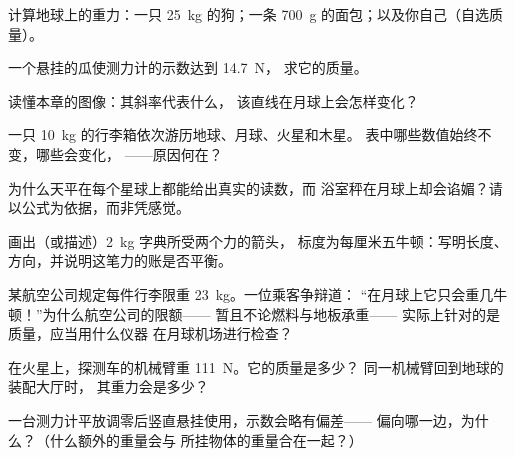 \begin{exercise}[$\star$]\label{exo:g9:weight-vs-mass:3}
计算地球上的重力：一只 \qty{25}{kg} 的狗；一条 \qty{700}{g}
的面包；以及你自己（自选质量）。
\end{exercise}

\begin{exercise}[$\star$]\label{exo:g9:weight-vs-mass:4}
一个悬挂的瓜使测力计的示数达到 \qty{14.7}{N}，
求它的质量。
\end{exercise}

\begin{exercise}[$\star$]\label{exo:g9:weight-vs-mass:5}
读懂本章的图像：其斜率代表什么，
该直线在月球上会怎样变化？
\end{exercise}

\begin{exercise}[$\star$]\label{exo:g9:weight-vs-mass:6}
一只 \qty{10}{kg} 的行李箱依次游历地球、月球、火星和木星。
表中哪些数值始终不变，哪些会变化，
——原因何在？
\end{exercise}

\begin{exercise}[$\star$]\label{exo:g9:weight-vs-mass:7}
为什么天平在每个星球上都能给出真实的读数，而
浴室秤在月球上却会谄媚？请以公式为依据，而非凭感觉。
\end{exercise}

\begin{exercise}[$\star$]\label{exo:g9:weight-vs-mass:8}
画出（或描述）\qty{2}{kg} 字典所受两个力的箭头，
标度为每厘米五牛顿：写明长度、
方向，并说明这笔力的账是否平衡。
\end{exercise}

\begin{exercise}[$\star\star$]\label{exo:g9:weight-vs-mass:9}
某航空公司规定每件行李限重 \qty{23}{kg}。一位乘客争辩道：
“在月球上它只会重几牛顿！”为什么航空公司的限额——
暂且不论燃料与地板承重——
实际上针对的是质量，应当用什么仪器
在月球机场进行检查？
\end{exercise}

\begin{exercise}[$\star\star$]\label{exo:g9:weight-vs-mass:10}
在火星上，探测车的机械臂重 \qty{111}{N}。它的质量是多少？
同一机械臂回到地球的装配大厅时，
其重力会是多少？
\end{exercise}

\begin{exercise}[$\star\star$]\label{exo:g9:weight-vs-mass:11}
一台测力计平放调零后竖直悬挂使用，示数会略有偏差——
偏向哪一边，为什么？（什么额外的重量会与
所挂物体的重量合在一起？）
\end{exercise}

